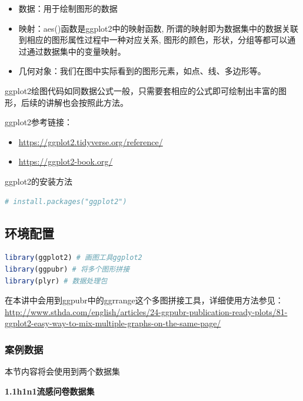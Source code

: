 \documentclass[]{ctexbook}
\providecommand{\tightlist}{%
  \setlength{\itemsep}{0pt}\setlength{\parskip}{0pt}}
\begin{document}
\begin{itemize}
\tightlist
\item
  数据：用于绘制图形的数据
\item
  映射：aes()函数是ggplot2中的映射函数, 所谓的映射即为数据集中的数据关联到相应的图形属性过程中一种对应关系, 图形的颜色，形状，分组等都可以通过通过数据集中的变量映射。
\item
  几何对象：我们在图中实际看到的图形元素，如点、线、多边形等。
\end{itemize}

ggplot2绘图代码如同数据公式一般，只需要套相应的公式即可绘制出丰富的图形，后续的讲解也会按照此方法。

ggplot2参考链接：

\begin{itemize}
\tightlist
\item
  \url{https://ggplot2.tidyverse.org/reference/}
\item
  \url{https://ggplot2-book.org/}
\end{itemize}

ggplot2的安装方法

\begin{lstlisting}[language=R]
# install.packages("ggplot2")
\end{lstlisting}

\hypertarget{ux73afux5883ux914dux7f6e-2}{%
\subsection{环境配置}\label{ux73afux5883ux914dux7f6e-2}}

\begin{lstlisting}[language=R]
library(ggplot2) # 画图工具ggplot2
library(ggpubr) # 将多个图形拼接
library(plyr) # 数据处理包
\end{lstlisting}

在本讲中会用到ggpubr中的ggrrange这个多图拼接工具，详细使用方法参见：
\url{http://www.sthda.com/english/articles/24-ggpubr-publication-ready-plots/81-ggplot2-easy-way-to-mix-multiple-graphs-on-the-same-page/}

\hypertarget{ux6848ux4f8bux6570ux636e-1}{%
\subsubsection*{案例数据}\label{ux6848ux4f8bux6570ux636e-1}}


本节内容将会使用到两个数据集

\textbf{1.1h1n1流感问卷数据集}
\end{document}
